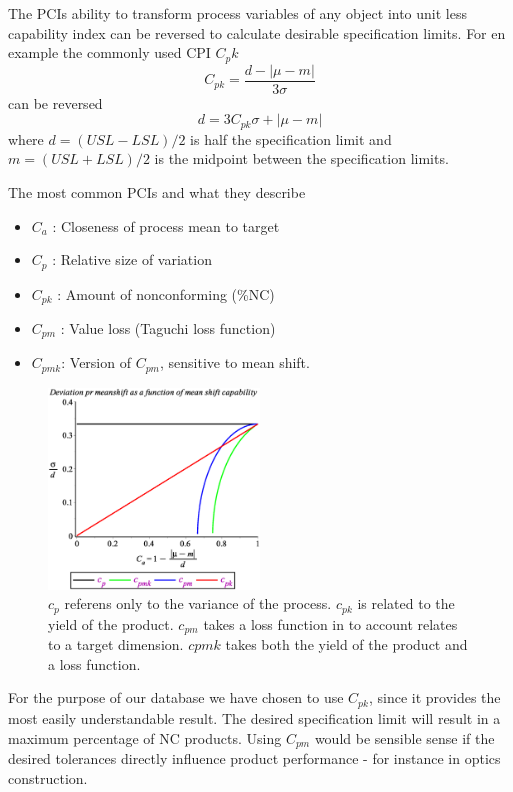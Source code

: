 \documentclass[aip,amsmath, reprint, author-year]{revtex4-1}
\begin{document}
The PCIs ability to transform process variables of any object into unit less capability index can be reversed to calculate desirable specification limits. For en example the commonly used CPI $C_pk$ 
\begin{equation}
	C_{pk} = \frac{d - | \mu - m|}{3 \sigma}
\end{equation}
can be reversed
\begin{equation}
	d = 3 C_{pk} \sigma + | \mu - m|
\end{equation}
where $d = (USL - LSL) / 2$ is half the specification limit and $m = (USL + LSL) / 2$ is the midpoint between the specification limits. 

The most common PCIs and what they describe \citep{wu2009overview, taguchi1986introduction}
\begin{itemize}
	\item $C_a$ : Closeness of process mean to target 
	\item $C_p$ : Relative size of variation
	\item $C_{pk}$ : Amount of nonconforming (\%NC)
	\item $C_{pm}$ : Value loss (Taguchi loss function)
	\item $C_{pmk}$: Version of $C_{pm}$,  sensitive to mean shift. 
\end{itemize}

\begin{figure}
\includegraphics[width=0.5\textwidth]{graph_postscript_test.eps}
\caption{\label{fig:cpk} $c_p$ referens only to the variance of the process. $c_{pk}$ is related to the yield of the product. $c_{pm}$ takes a loss function in to account relates to a target dimension. $cpmk$ takes both the yield of the product and a loss function. }
\end{figure}

For the purpose of our database we have chosen to use $C_{pk}$, since it provides the most easily understandable result. The desired specification limit will result in a maximum percentage of NC products. Using $C_{pm}$ would be sensible sense if the desired tolerances directly influence product performance - for instance in optics construction.  
\end{document}
